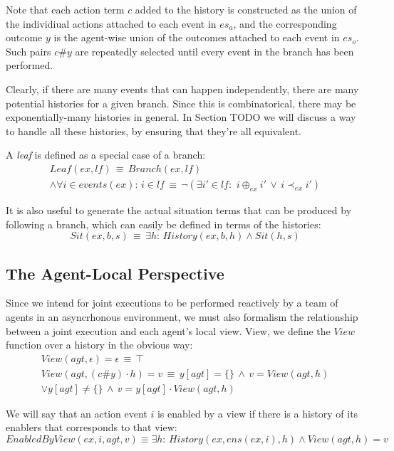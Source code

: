 Note that each action term $c$ added to the history is constructed
as the union of the individiual actions attached to each event in
$es_{a}$, and the corresponding outcome $y$ is the agent-wise union
of the outcomes attached to each event in $es_{o}$. Such pairs $c\#y$
are repeatedly selected until every event in the branch has been performed.

Clearly, if there are many events that can happen independently, there
are many potential histories for a given branch. Since this is combinatorical,
there may be exponentially-many histories in general. In Section TODO
we will discuss a way to handle all these histories, by ensuring that
they're all equivalent.

A \emph{leaf} is defined as a special case of a branch:\begin{multline*}
Leaf(ex,lf)\,\equiv\, Branch(ex,lf)\\
\wedge\forall i\in events(ex):\, i\in lf\,\equiv\,\neg(\exists i'\in lf:\,\, i\oplus_{ex}i'\,\vee\, i\prec_{ex}i')\end{multline*}


It is also useful to generate the actual situation terms that can
be produced by following a branch, which can easily be defined in
terms of the histories:\[
Sit(ex,b,s)\,\equiv\,\exists h:\, History(ex,b,h)\wedge Sit(h,s)\]



\subsection{The Agent-Local Perspective}

Since we intend for joint executions to be performed reactively by
a team of agents in an asyncrhonous environment, we must also formalism
the relationship between a joint execution and each agent's local
view. View, we define the $View$ function over a history in the obvious
way:\begin{gather*}
View(agt,\epsilon)=\epsilon\,\equiv\,\top\\
View(agt,(c\#y)\cdot h)=v\,\equiv\, y[agt]=\{\}\,\wedge\, v=View(agt,h)\\
\vee y[agt]\neq\{\}\,\wedge\, v=y[agt]\cdot View(agt,h)\end{gather*}


We will say that an action event $i$ is enabled by a view if there
is a history of its enablers that corresponds to that view: \[
EnabledByView(ex,i,agt,v)\equiv\exists h:\, History(ex,ens(ex,i),h)\wedge View(agt,h)=v\]


